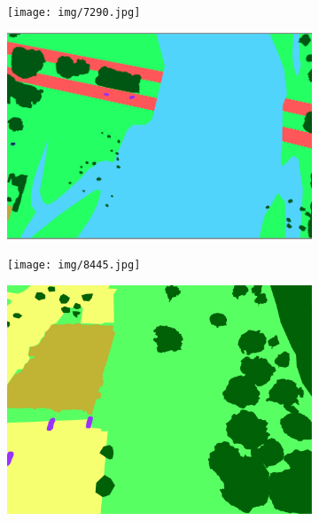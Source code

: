 \begin{itemize}
\begin{itemize}
        \begin{figure}[h!]
         \centering
         \begin{subfigure}[b]{0.45\textwidth}
             \centering
             \texttt{[image: img/7290.jpg]}
             \caption{}
             \label{}
         \end{subfigure}
         \hfill
         \begin{subfigure}[b]{0.45\textwidth}
             \centering
             \includegraphics[width=\textwidth]{img/7290_lab.png}
             \caption{}
             \label{}
         \end{subfigure}
         \hfill
         \begin{subfigure}[b]{0.45\textwidth}
             \centering
             \texttt{[image: img/8445.jpg]}
             \caption{}
             \label{}
         \end{subfigure}
         \hfill
         \begin{subfigure}[b]{0.45\textwidth}
             \centering
             \includegraphics[width=\textwidth]{img/8445_lab 2.png}

\end{subfigure}
\end{figure}
\end{itemize}
\end{itemize}
